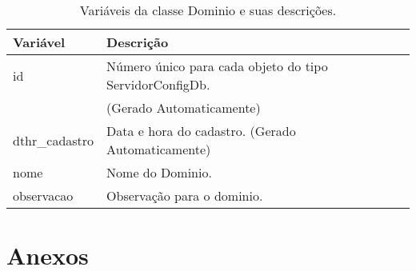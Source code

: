 \begin{table}[!ht]
\centering
\begin{tabular}{|l|l|}
\hline
{\color[HTML]{000000} \textbf{Variável}} & {\color[HTML]{000000} \textbf{Descrição}}                                        \\ \hline
id                                       & Número único para cada objeto do tipo ServidorConfigDb.\\
																				 & (Gerado Automaticamente) \\ \hline
dthr\_cadastro                           & Data e hora do cadastro. (Gerado Automaticamente)                                \\ \hline
nome                                     & Nome do Dominio.                                                                 \\ \hline
observacao                               & Observação para o dominio.                                                       \\ \hline
\end{tabular}
\caption[Variáveis da classe Dominio e suas descrições.]{Variáveis da classe Dominio e suas descrições.}
\label{Tab:VariaveisDominio}
\end{table}


\chapter{Anexos} \label{App:ApendiceB}

